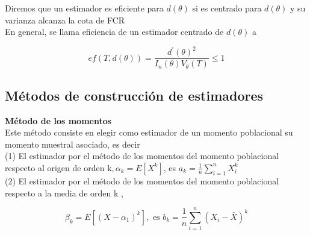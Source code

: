 

\begin{definición} 
Diremos que un estimador es eficiente para $d(\theta)$ si es centrado para $d(\theta)$ y su varianza alcanza la cota de FCR\\
En general, se llama eficiencia de un estimador centrado de $d(\theta)$ a

$$
  e f(T, d(\theta))=\frac{d^{\prime}(\theta)^{2}}{I_{n}(\theta) V_{\theta}(T)} \leq 1
$$
\end{definición}

\subsection{Métodos de construcción de estimadores}
\textbf{Método de los momentos}\\
Este método consiste en elegir como estimador de un momento poblacional su momento muestral asociado, es decir\\
(1) El estimador por el método de los momentos del momento poblacional respecto al origen de orden $\mathrm{k}, \alpha_{k}=E\left[X^{k}\right]$, es $a_{k}=\frac{1}{n} \sum_{i=1}^{n} X_{i}^{k}$\\
(2) El estimador por el método de los momentos del momento poblacional respecto a la media de orden k ,

$$
  \beta_{k}=E\left[\left(X-\alpha_{1}\right)^{k}\right], \text { es } b_{k}=\frac{1}{n} \sum_{i=1}^{n}\left(X_{i}-\bar{X}\right)^{k}
$$

